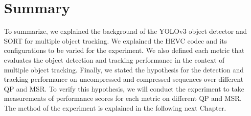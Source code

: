 \section{Summary}
\label{sec:background/summary}

To summarize, we explained the background of the YOLOv3 object detector and SORT for multiple object tracking. We explained the HEVC codec and its configurations to be varied for the experiment. We also defined each metric that evaluates the object detection and tracking performance in the context of multiple object tracking. Finally, we stated the hypothesis for the detection and tracking performance on uncompressed and compressed sequences over different QP and MSR. To verify this hypothesis, we will conduct the experiment to take measurements of performance scores for each metric on different QP and MSR. The method of the experiment is explained in the following next Chapter.
